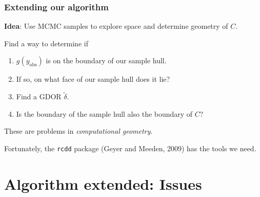 \documentclass[ 10pt]{beamer}
\newcommand{\yobs}{y_{\text{obs}}}
\begin{document}
\frame
{
\frametitle{Extending our algorithm}  

\textbf{Idea}: Use MCMC samples to explore space and
determine geometry of $C$.
%

\vspace{2mm}
\pause

Find a way to determine if
\begin{enumerate}
\item $g(\yobs)$ is on the boundary of our sample hull.
\vspace{2mm}
\pause
\item If so, on what face of our sample hull does it lie?
\vspace{2mm}
\pause
\item Find a GDOR $\tilde{\delta}$.
\vspace{2mm}
\pause
\item Is the boundary of the sample hull also the boundary of $C$?
\end{enumerate}

\vspace{4mm}
\pause
These are problems in \emph{computational geometry}.  

Fortunately, the \texttt{rcdd} package (Geyer and Meeden, 2009) has the 
tools we need.

}

\section{Algorithm extended: Issues}
\end{document}
